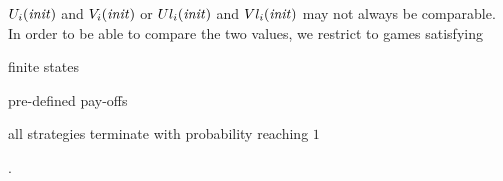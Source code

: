 

%
%


$U_i(\mathit{init})$ and $V_i(\mathit{init})$ or $Ul_i(\mathit{init})$ and $Vl_i(\mathit{init})$ may not always be comparable. In order to be able to compare the two values, we restrict to games satisfying \begin{inparaenum}
	\item finite states
	\item pre-defined pay-offs
	\item all strategies terminate with probability reaching $1$
\end{inparaenum}.

